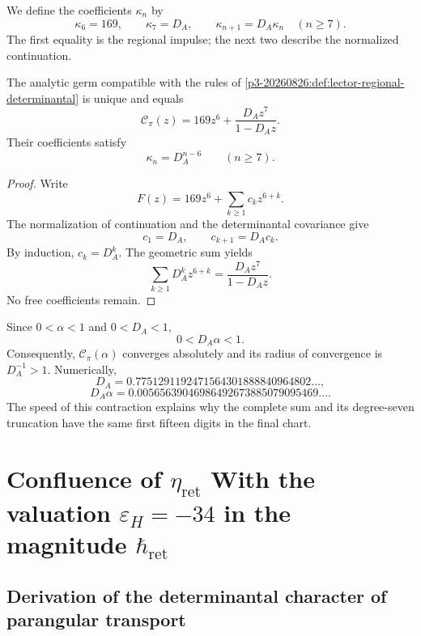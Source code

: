 
We define the coefficients \(\kappa_n\) by
\[
\kappa_6=169,
\qquad
\kappa_7=D_A,
\qquad
\kappa_{n+1}=D_A\kappa_n\quad(n\ge7).
\]
The first equality is the regional impulse; the next two describe the normalized continuation.

\begin{theorem}
\label{p3-20260826:thm:realizacion-analitica-graduada}
The analytic germ compatible with the rules of
\cref{p3-20260826:def:lector-regional-determinantal} is unique and equals
\[
\boxed{
\mathscr C_\pi(z)
=169z^6+\frac{D_Az^7}{1-D_Az}.}
\]
Their coefficients satisfy
\[
\kappa_n=D_A^{n-6}\qquad(n\ge7).
\]
\end{theorem}

\begin{proof}
Write
\[
F(z)=169z^6+\sum_{k\ge1}c_kz^{6+k}.
\]
The normalization of continuation and the determinantal covariance give
\[
c_1=D_A,
\qquad
c_{k+1}=D_Ac_k.
\]
By induction, \(c_k=D_A^k\). The geometric sum yields
\[
\sum_{k\ge1}D_A^kz^{6+k}
=\frac{D_Az^7}{1-D_Az}.
\]
No free coefficients remain.
\end{proof}

Since \(0<\alpha<1\) and
\(0<D_A<1\),
\[
0<D_A\alpha<1.
\]
Consequently, \(\mathscr C_\pi(\alpha)\) converges absolutely and its
radius of convergence is \(D_A^{-1}>1\). Numerically,
\[
D_A=0.7751291192471564301888840964802\ldots,
\]
\[
D_A\alpha=0.00565639046986492673885079095469\ldots.
\]
The speed of this contraction explains why the complete sum and its
degree-seven truncation have the same first fifteen digits in the
final chart.

\section{Confluence of \texorpdfstring{\(\eta_{\mathrm{ret}}\)}{eta_ret} With the valuation \texorpdfstring{\(\varepsilon_H=-34\)}{epsilon_H=-34} in the magnitude \texorpdfstring{\(\hbar_{\mathrm{ret}}\)}{hbar_ret}}
\label{sec:s102:c38:3}

\subsection{Derivation of the determinantal character of parangular transport}
\label{sec:s102:c38:3:1}

